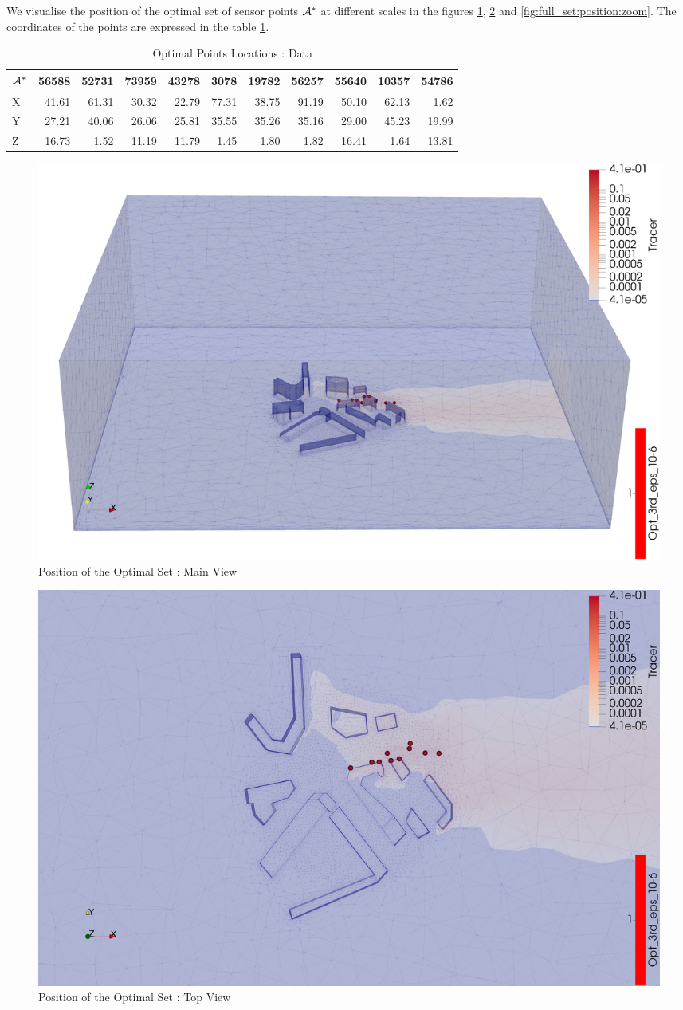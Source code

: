 We visualise the position of the optimal set of sensor points $\mathcal{A}^*$ at different scales in the figures \ref{fig:full_set:position:all}, \ref{fig:full_set:position:top} and \ref{fig:full_set:position:zoom}. The coordinates of the points are expressed in the table \ref{tab:full:data}. \\


\begin{table}[h]
\centering
\footnotesize
\begin{tabular}{|l|rrrrrrrrrr|}
\hline
$\mathcal{A}^*$ &  56588 &  52731 &  73959 &  43278 &  3078  &  19782 &  56257 &  55640 &  10357 &  54786 \\ \hline
X &  41.61 &  61.31 &  30.32 &  22.79 &  77.31 &  38.75 &  91.19 &  50.10 &  62.13 &   1.62 \\
Y &  27.21 &  40.06 &  26.06 &  25.81 &  35.55 &  35.26 &  35.16 &  29.00 &  45.23 &  19.99 \\
Z &  16.73 &   1.52 &  11.19 &  11.79 &   1.45 &   1.80 &   1.82 &  16.41 &   1.64 &  13.81 \\
\hline
\end{tabular}
\caption{Optimal Points Locations : Data}
\label{tab:full:data}
\end{table}



\begin{figure}[h!]
\centering
\includegraphics[width=0.7\linewidth]{figures/MainOptimResults/alg3opteps10-6_sideall_screenshot}
\caption{Position of the Optimal Set : Main View}
\label{fig:full_set:position:all}
\end{figure}



\begin{figure}[h!]
\centering
\includegraphics[width=0.7\linewidth]{figures/MainOptimResults/alg3opteps10-6_top_screenshot}
\caption{Position of the Optimal Set : Top View}
\label{fig:full_set:position:top}
\end{figure}

